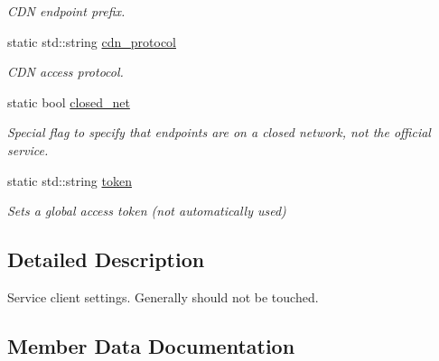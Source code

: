 \begin{DoxyCompactItemize}
\begin{DoxyCompactList}\small\item\em C\+DN endpoint prefix. \end{DoxyCompactList}\item 
static std\+::string \hyperlink{classEmojidex_1_1Service_1_1Settings_a007200735113741cec8282054eda7338}{cdn\+\_\+protocol}\hypertarget{classEmojidex_1_1Service_1_1Settings_a007200735113741cec8282054eda7338}{}\label{classEmojidex_1_1Service_1_1Settings_a007200735113741cec8282054eda7338}

\begin{DoxyCompactList}\small\item\em C\+DN access protocol. \end{DoxyCompactList}\item 
static bool \hyperlink{classEmojidex_1_1Service_1_1Settings_a4794a14aa2dda9d5e238c4b4c289e77c}{closed\+\_\+net}
\begin{DoxyCompactList}\small\item\em Special flag to specify that endpoints are on a closed network, not the official service. \end{DoxyCompactList}\item 
static std\+::string \hyperlink{classEmojidex_1_1Service_1_1Settings_a1aa303c664a4b238dd72c92e9660f3c4}{token}\hypertarget{classEmojidex_1_1Service_1_1Settings_a1aa303c664a4b238dd72c92e9660f3c4}{}\label{classEmojidex_1_1Service_1_1Settings_a1aa303c664a4b238dd72c92e9660f3c4}

\begin{DoxyCompactList}\small\item\em Sets a global access token (not automatically used) \end{DoxyCompactList}\end{DoxyCompactItemize}


\subsection{Detailed Description}
Service client settings. Generally should not be touched. 

\subsection{Member Data Documentation}
